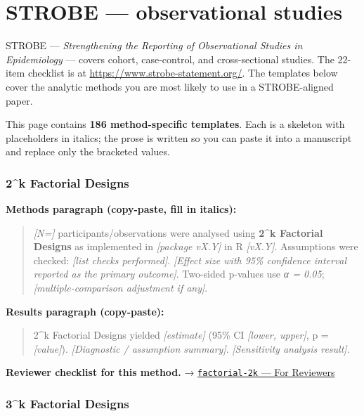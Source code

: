 \documentclass[
]{article}
\author{}
\date{\vspace{-2.5em}}
\begin{document}
\section{STROBE --- observational
studies}\label{strobe-observational-studies}

STROBE --- \emph{Strengthening the Reporting of Observational Studies in
Epidemiology} --- covers cohort, case-control, and cross-sectional
studies. The 22-item checklist is at
\url{https://www.strobe-statement.org/}. The templates below cover the
analytic methods you are most likely to use in a STROBE-aligned paper.

This page contains \textbf{186 method-specific templates}. Each is a
skeleton with placeholders in italics; the prose is written so you can
paste it into a manuscript and replace only the bracketed values.

\subsubsection{2\^{}k Factorial Designs}\label{k-factorial-designs}

\textbf{Methods paragraph (copy-paste, fill in italics):}

\begin{quote}
\emph{{[}N={]}} participants/observations were analysed using
\textbf{2\^{}k Factorial Designs} as implemented in \emph{{[}package
vX.Y{]}} in R \emph{{[}vX.Y{]}}. Assumptions were checked: \emph{{[}list
checks performed{]}}. \emph{{[}Effect size with 95\% confidence interval
reported as the primary outcome{]}}. Two-sided p-values use \emph{α =
0.05}; \emph{{[}multiple-comparison adjustment if any{]}}.
\end{quote}

\textbf{Results paragraph (copy-paste):}

\begin{quote}
2\^{}k Factorial Designs yielded \emph{{[}estimate{]}} (95\% CI
\emph{{[}lower, upper{]}}, p = \emph{{[}value{]}}). \emph{{[}Diagnostic
/ assumption summary{]}}. \emph{{[}Sensitivity analysis result{]}}.
\end{quote}

\textbf{Reviewer checklist for this method.} →
\href{../chapters/16-design/factorial-2k.Rmd\#for-reviewers}{\texttt{factorial-2k}
--- For Reviewers}

\subsubsection{3\^{}k Factorial Designs}\label{k-factorial-designs-1}
\end{document}
